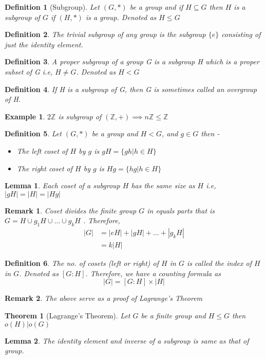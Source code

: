 \documentclass[12pt,a4paper]{article}
\newcommand{\Z}{\mathbb{Z}}
\newtheorem{thm}{Theorem}
\newtheorem*{defn}{Definition}
\newtheorem*{rem}{Remark}
\newtheorem*{lem}{Lemma}
\newtheorem{ex}{Example}
\begin{document}
\begin{defn}[Subgroup]
	Let $(G,*)$ be a group and if $H \subseteq G$ then $H$ is a subgroup of $G$ if $(H,*)$ is a group. Denoted as $H \le G$
\end{defn}
\begin{defn}
	The trivial subgroup of any group is the subgroup $\{e\}$ consisting of just the identity element.
\end{defn}
\begin{defn}
	A proper subgroup of a group G is a subgroup H which is a proper subset of G i.e, $H \ne G$. Denoted as $H < G$
\end{defn}
\begin{defn}
	If H is a subgroup of G, then G is sometimes called an overgroup of H.
\end{defn}
\begin{ex}
	$2\Z$ is subgroup of $(\Z, +) \implies n\Z \le \Z$
\end{ex}

\begin{defn}
	Let $(G,*)$ be a group and $H<G$, and $g \in G$ then -
	\begin{itemize}
		\item The left coset of $H$ by $g$ is $gH = \{gh | h \in H\}$
		\item The right coset of $H$ by $g$ is $Hg = \{hg | h \in H\}$
	\end{itemize}
\end{defn}
\begin{lem}
	Each coset of a subgroup $H$ has the same size as $H$ i.e, $|gH|=|H|=|Hg|$
\end{lem}

\begin{rem}
Coset divides the finite group $G$ in equals parts that is $G = H \cup g_{1}H \cup \dots \cup g_{k}H$ . Therefore,
\begin{align*}
		|G| &= |eH| + |gH| + \dots + |g_{k}H| \\
			&= k|H|
\end{align*}
\end{rem}

\begin{defn}
	The no. of cosets (left or right) of $H$ in $G$ is called the index of $H$ in $G$. Denoted as $[G:H]$. Therefore, we have a counting formula as $$
		|G| = [G:H] \times |H|
	$$
\end{defn}
\begin{rem}
	The above serve as a proof of Lagrange's Theorem
\end{rem}
\begin{thm}[Lagrange's Theorem]
	Let $G$ be a finite group and $H \le G$ then $o(H)|o(G)$
\end{thm}
\begin{lem}
	The identity element and inverse of a subgroup is same as that of group.
\end{lem}
\end{document}
